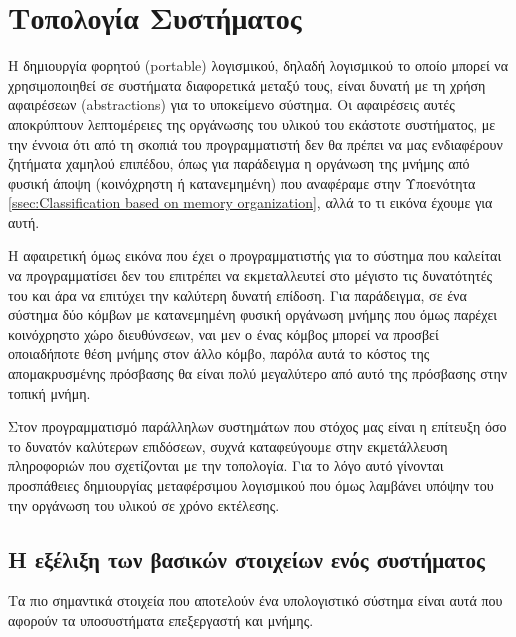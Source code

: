 \chapter{Τοπολογία Συστήματος}
\label{ch:System Topology}
Η δημιουργία φορητού (portable) λογισμικού, δηλαδή λογισμικού το οποίο μπορεί να χρησιμοποιηθεί σε συστήματα διαφορετικά μεταξύ τους, είναι δυνατή με τη χρήση αφαιρέσεων (abstractions) για το υποκείμενο σύστημα. Οι αφαιρέσεις αυτές αποκρύπτουν λεπτομέρειες της οργάνωσης του υλικού του εκάστοτε συστήματος, με την έννοια ότι από τη σκοπιά του προγραμματιστή δεν θα πρέπει να μας ενδιαφέρουν ζητήματα χαμηλού επιπέδου, όπως για παράδειγμα η οργάνωση της μνήμης από φυσική άποψη (κοινόχρηστη ή κατανεμημένη) που αναφέραμε στην Υποενότητα \ref{ssec:Classification based on memory organization}, αλλά το τι εικόνα έχουμε για αυτή.

Η αφαιρετική όμως εικόνα που έχει ο προγραμματιστής για το σύστημα που καλείται να προγραμματίσει δεν του επιτρέπει να εκμεταλλευτεί στο μέγιστο τις δυνατότητές του και άρα να επιτύχει την καλύτερη δυνατή επίδοση. Για παράδειγμα, σε ένα σύστημα δύο κόμβων με κατανεμημένη φυσική οργάνωση μνήμης που όμως παρέχει κοινόχρηστο χώρο διευθύνσεων, ναι μεν ο ένας κόμβος μπορεί να προσβεί οποιαδήποτε θέση μνήμης στον άλλο κόμβο, παρόλα αυτά το κόστος της απομακρυσμένης πρόσβασης θα είναι πολύ μεγαλύτερο από αυτό της πρόσβασης στην τοπική μνήμη.

Στον προγραμματισμό παράλληλων συστημάτων που στόχος μας είναι η επίτευξη όσο το δυνατόν καλύτερων επιδόσεων, συχνά καταφεύγουμε στην εκμετάλλευση πληροφοριών που σχετίζονται με την τοπολογία. Για το λόγο αυτό γίνονται προσπάθειες δημιουργίας μεταφέρσιμου λογισμικού που όμως λαμβάνει υπόψην του την οργάνωση του υλικού σε χρόνο εκτέλεσης.



\section{Η εξέλιξη των βασικών στοιχείων ενός συστήματος}
Τα πιο σημαντικά στοιχεία που αποτελούν ένα υπολογιστικό σύστημα είναι αυτά που αφορούν τα υποσυστήματα επεξεργαστή και μνήμης.

